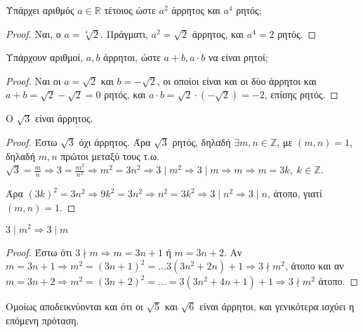 \documentclass[main.tex]{subfiles}
\begin{document}
\begin{example}
  Υπάρχει αριθμός $ a \in \mathbb{R} $ τέτοιος ώστε $ a^{2} $ άρρητος και $ a^{4} $ 
  ρητός; 
\end{example}

\begin{proof}
  Ναι, ο $ a= \sqrt[4]{2} $. Πράγματι, $ a^{2} = \sqrt{2} $ άρρητος, και $ 
  a^{4} = 2$ ρητός.
\end{proof}

\begin{example}
  Υπάρχουν αριθμοί, $ a,b $ άρρητοι, ώστε $ a+b, a\cdot b $ να είναι ρητοί;
\end{example}

\begin{proof}
  Ναι οι $ a= \sqrt{2} $ και $ b= - \sqrt{2} $, οι οποίοι είναι και οι δύο άρρητοι 
  και $ a+b= \sqrt{2} - \sqrt{2} = 0 $ ρητός, και $ a\cdot b = \sqrt{2} \cdot (- 
  \sqrt{2}) = -2 $, επίσης ρητός.
\end{proof}

\begin{example}
  Ο $ \sqrt{3} $ είναι άρρητος.
\end{example}

\begin{proof}
  Έστω $ \sqrt{3} $ όχι άρρητος. Άρα $ \sqrt{3} $ ρητός, δηλαδή $ \exists m,n 
  \in \mathbb{Z} $, με $ (m,n)=1 $, δηλαδή $ m,n $ πρώτοι μεταξύ τους
  τ.ω. $ \sqrt{3} = \frac{m}{n} \Rightarrow 3 = \frac{m^{2}}{n^{2}} \Rightarrow 
  m^{2} = 3n^{2} \Rightarrow 3 \mid m^{2} \Rightarrow 3 \mid m  \Rightarrow m 
  \Rightarrow m = 3k, \; k \in \mathbb{Z}$. 

  Άρα $ (3k)^{2} = 3n^{2} \Rightarrow 9k^{2}=3n^{2} \Rightarrow n^{2} = 3k^{2} 
  \Rightarrow 3 \mid n^{2} \Rightarrow  3 \mid n$,  άτοπο, γιατί $ (m,n)=1 $.
\end{proof}

\begin{lem}
  $ 3 \mid m^{2} \Rightarrow 3 \mid m $
\end{lem}

\begin{proof}
  Έστω ότι $ 3 \nmid m \Rightarrow m = 3n +1 $ ή $ m = 3n+2 $. 
  Αν $ m=3n+1 \Rightarrow m^{2} = (3n+1)^{2} = \ldots 3(3n^{2}+2n)+1 \Rightarrow 
  3 \nmid m^{2}$, άτοπο και αν $ m =3n+2 \Rightarrow m^{2}=(3n+2)^{2} = \ldots = 
  3(3n^{2}+4n+1)+1 \Rightarrow 3 \nmid m^{2}$ άτοπο.
\end{proof}

\begin{rem}
  Ομοίως αποδεικνύονται και ότι οι $ \sqrt{5}$ και  $ \sqrt{6} $ είναι άρρητοι, 
  και γενικότερα ισχύει η επόμενη πρόταση.
\end{rem}
\end{document}

